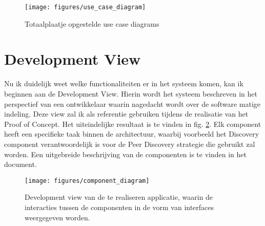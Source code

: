 \clearpage

\begin{figure}
    \texttt{[image: figures/use\_case\_diagram]}
    \caption[Use-case diagram]{Totaalplaatje opgestelde use case diagrams}
    \label{architecture:use-case-diagram}
\end{figure}

\section{Development View}

Nu ik duidelijk weet welke functionaliteiten er in het systeem komen, kan ik beginnen aan de Development View. Hierin wordt het systeem beschreven in het perspectief van een ontwikkelaar waarin nagedacht wordt over de software matige indeling. Deze view zal ik als referentie gebruiken tijdens de realisatie van het Proof of Concept. Het uiteindelijke resultaat is te vinden in fig. \ref{architecture:component-diagram}. Elk component heeft een specifieke taak binnen de architectuur, waarbij voorbeeld het Discovery component verantwoordelijk is voor de Peer Discovery strategie die gebruikt zal worden. Een uitgebreide beschrijving van de componenten is te vinden in het  document. 

\clearpage

\begin{figure}[h]
    \texttt{[image: figures/component\_diagram]}
    \caption[Development View]{Development view van de te realiseren applicatie, waarin de interacties tussen de componenten in de vorm van interfaces weergegeven worden.}
    \label{architecture:component-diagram}
\end{figure}